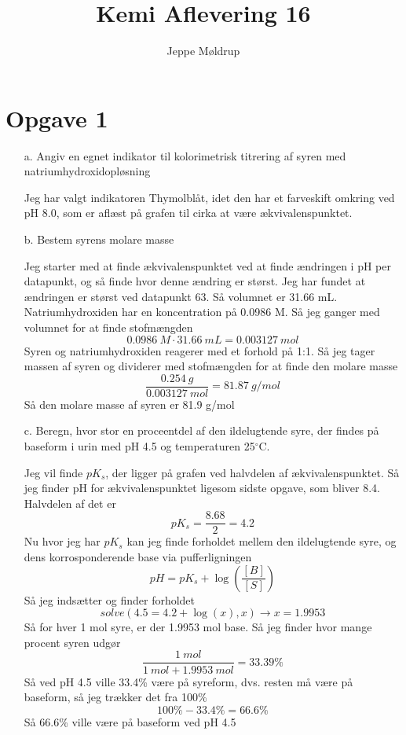 \documentclass[12pt]{article}
\title{Kemi Aflevering 16}
\author{Jeppe Møldrup}
\date{}
\begin{document}
\maketitle

\section*{Opgave 1}

\begin{enumerate}

        \item[a.] Angiv en egnet indikator til kolorimetrisk titrering
                af syren med natriumhydroxidopløsning

                Jeg har valgt indikatoren Thymolblåt, idet den har et
                farveskift omkring ved pH 8.0, som er aflæst på
                grafen til cirka at være ækvivalenspunktet.

        \item[b.] Bestem syrens molare masse

                Jeg starter med at finde ækvivalenspunktet ved at finde
                ændringen i pH per datapunkt, og så finde hvor denne
                ændring er størst. Jeg har fundet at ændringen er størst
                ved datapunkt 63. Så volumnet er 31.66 mL.\\
                Natriumhydroxiden har en koncentration på 0.0986 M. Så jeg
                ganger med volumnet for at finde stofmængden
                $$0.0986\ M\cdot 31.66\ mL = 0.003127\ mol$$
                Syren og natriumhydroxiden reagerer med et forhold på 1:1.
                Så jeg tager massen af syren og dividerer med stofmængden
                for at finde den molare masse
                $$\frac{0.254\ g}{0.003127\ mol} = 81.87\ g/mol$$
                Så den molare masse af syren er 81.9 g/mol

        \item[c.] Beregn, hvor stor en proceentdel af den ildelugtende syre, der
                findes på baseform i urin med pH 4.5 og temperaturen 25$^{\circ}$C.

                Jeg vil finde $pK_s$, der ligger på grafen ved halvdelen
                af ækvivalenspunktet. Så jeg finder pH for ækvivalenspunktet
                ligesom sidste opgave, som bliver 8.4. Halvdelen af det er
                $$pK_s = \frac{8.68}{2} = 4.2$$
                Nu hvor jeg har $pK_s$ kan jeg finde forholdet mellem den
                ildelugtende syre, og dens korrosponderende base via
                pufferligningen
                $$pH = pK_s+\log \left( \frac{[B]}{[S]} \right)$$
                Så jeg indsætter og finder forholdet
                $$solve(4.5 = 4.2+\log(x),x) \rightarrow x = 1.9953$$
                Så for hver 1 mol syre, er der 1.9953 mol base. Så jeg
                finder hvor mange procent syren udgør
                $$\frac{1\ mol}{1\ mol+1.9953\ mol} = 33.39\%$$
                Så ved pH 4.5 ville 33.4\% være på syreform, dvs. resten
                må være på baseform, så jeg trækker det fra 100\%
                $$100\%-33.4\% = 66.6\%$$
                Så 66.6\% ville være på baseform ved pH 4.5


\end{enumerate}
\end{document}
